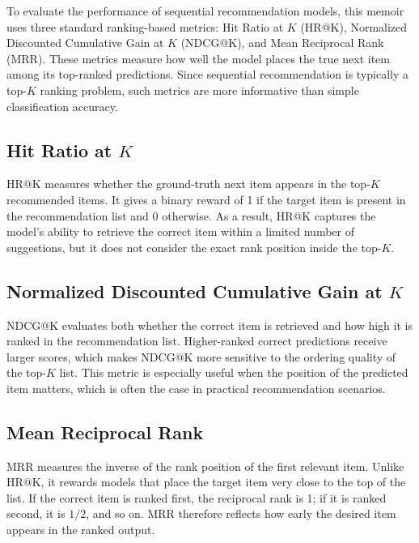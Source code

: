 \documentclass[12pt,a4paper]{report}
\begin{document}
To evaluate the performance of sequential recommendation models, this memoir
uses three standard ranking-based metrics: Hit Ratio at \(K\) (HR@K),
Normalized Discounted Cumulative Gain at \(K\) (NDCG@K), and Mean Reciprocal
Rank (MRR). These metrics measure how well the model places the true next item
among its top-ranked predictions. Since sequential recommendation is typically a
top-\(K\) ranking problem, such metrics are more informative than simple
classification accuracy.

\subsection{Hit Ratio at \(K\)}

HR@K measures whether the ground-truth next item appears in the top-\(K\)
recommended items. It gives a binary reward of 1 if the target item is present
in the recommendation list and 0 otherwise. As a result, HR@K captures the
model's ability to retrieve the correct item within a limited number of
suggestions, but it does not consider the exact rank position inside the top-\(K\).

\subsection{Normalized Discounted Cumulative Gain at \(K\)}

NDCG@K evaluates both whether the correct item is retrieved and how high it is
ranked in the recommendation list. Higher-ranked correct predictions receive
larger scores, which makes NDCG@K more sensitive to the ordering quality of the
top-\(K\) list. This metric is especially useful when the position of the
predicted item matters, which is often the case in practical recommendation
scenarios.

\subsection{Mean Reciprocal Rank}

MRR measures the inverse of the rank position of the first relevant item.
Unlike HR@K, it rewards models that place the target item very close to the top
of the list. If the correct item is ranked first, the reciprocal rank is 1; if
it is ranked second, it is \(1/2\), and so on. MRR therefore reflects how early
the desired item appears in the ranked output.
\end{document}
